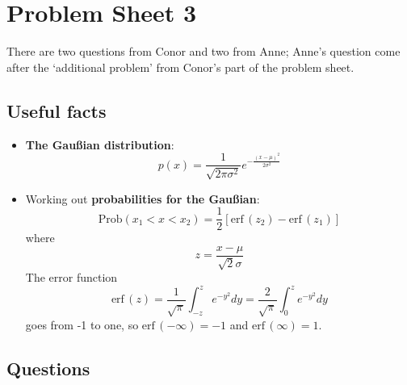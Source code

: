 \documentclass[11pt,a4paper]{scrartcl}
\begin{document}
\section*{Problem Sheet 3}

There are two questions from Conor and two from Anne; Anne's question come after the \lq{}additional problem\rq{} from Conor's part of the problem sheet.

\subsection*{Useful facts}

\begin{itemize}

\item \textbf{The Gau\ss{}ian distribution}:
$$
p(x)=\frac{1}{\sqrt{2\pi\sigma^2}}e^{-\frac{(x-\mu)^2}{2\sigma^2}}
$$

\item Working out \textbf{probabilities for the Gau\ss{}ian}:
$$
\mbox{Prob}(x_1<x<x_2)=\frac{1}{2}[\mbox{erf}\,(z_2)-\mbox{erf}\,(z_1)]
$$
where
$$
z=\frac{x-\mu}{\sqrt{2}\sigma}
$$
The error function 
$$\mbox{erf}\,(z)=\frac{1}{\sqrt{\pi}}\int_{-z}^ze^{-y^2}dy=\frac{2}{\sqrt{\pi}}\int_0^ze^{-y^2}dy$$ 
goes from -1 to one, so $\mbox{erf}\,(-\infty)=-1$ and $\mbox{erf}\,(\infty)=1$.
\end{itemize}



\subsection*{Questions}
\end{document}

